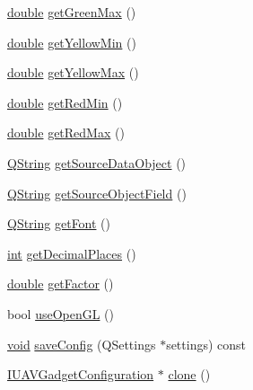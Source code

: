 \begin{DoxyCompactItemize}
\hyperlink{_super_l_u_support_8h_a8956b2b9f49bf918deed98379d159ca7}{double} \hyperlink{group___linear_dial_plugin_gaf0f52dd07291d938390b228e8e0a90f2}{get\-Green\-Max} ()
\item 
\hyperlink{_super_l_u_support_8h_a8956b2b9f49bf918deed98379d159ca7}{double} \hyperlink{group___linear_dial_plugin_gad39b6746e6b3b7c0e6d20794d2f494d9}{get\-Yellow\-Min} ()
\item 
\hyperlink{_super_l_u_support_8h_a8956b2b9f49bf918deed98379d159ca7}{double} \hyperlink{group___linear_dial_plugin_ga2c58391f9aa712de50504d4437b54ded}{get\-Yellow\-Max} ()
\item 
\hyperlink{_super_l_u_support_8h_a8956b2b9f49bf918deed98379d159ca7}{double} \hyperlink{group___linear_dial_plugin_ga2144cb1d1c1c13bd87529460a3ad88bc}{get\-Red\-Min} ()
\item 
\hyperlink{_super_l_u_support_8h_a8956b2b9f49bf918deed98379d159ca7}{double} \hyperlink{group___linear_dial_plugin_ga022f5eeb2931bde01bb130ac6cb237b7}{get\-Red\-Max} ()
\item 
\hyperlink{group___u_a_v_objects_plugin_gab9d252f49c333c94a72f97ce3105a32d}{Q\-String} \hyperlink{group___linear_dial_plugin_ga6b635f5d74e7815014a597e5a38e5e80}{get\-Source\-Data\-Object} ()
\item 
\hyperlink{group___u_a_v_objects_plugin_gab9d252f49c333c94a72f97ce3105a32d}{Q\-String} \hyperlink{group___linear_dial_plugin_ga1de5843a26127b379137ee870ec74b89}{get\-Source\-Object\-Field} ()
\item 
\hyperlink{group___u_a_v_objects_plugin_gab9d252f49c333c94a72f97ce3105a32d}{Q\-String} \hyperlink{group___linear_dial_plugin_ga044d31fb1388d1f8b1b11f682c4e2aaa}{get\-Font} ()
\item 
\hyperlink{ioapi_8h_a787fa3cf048117ba7123753c1e74fcd6}{int} \hyperlink{group___linear_dial_plugin_gab0a4ac1f433766548d4f87e0d4c1c499}{get\-Decimal\-Places} ()
\item 
\hyperlink{_super_l_u_support_8h_a8956b2b9f49bf918deed98379d159ca7}{double} \hyperlink{group___linear_dial_plugin_ga4bb648d826a5f7847ecdaa288a477b14}{get\-Factor} ()
\item 
bool \hyperlink{group___linear_dial_plugin_ga74595eab1c81ed96361010ba7f770bd1}{use\-Open\-G\-L} ()
\item 
\hyperlink{group___u_a_v_objects_plugin_ga444cf2ff3f0ecbe028adce838d373f5c}{void} \hyperlink{group___linear_dial_plugin_ga09129321da61b2494dca4ceafa18b996}{save\-Config} (Q\-Settings $\ast$settings) const 
\item 
\hyperlink{group___core_plugin_gacdfdf0b1e39b5002472b76b6564ce51f}{I\-U\-A\-V\-Gadget\-Configuration} $\ast$ \hyperlink{group___linear_dial_plugin_ga4b5d2c9802ec3b863732d6f707a1befe}{clone} ()
\end{DoxyCompactItemize}


